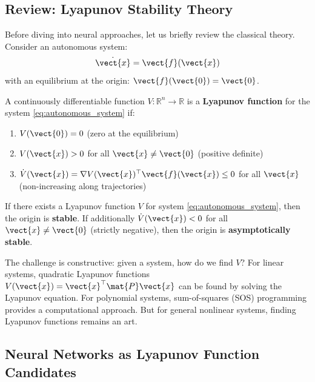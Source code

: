 \subsection{Review: Lyapunov Stability Theory}

Before diving into neural approaches, let us briefly review the classical theory. Consider an autonomous system:
\begin{equation}
\dot{\vect{x}} = \vect{f}(\vect{x})
\label{eq:autonomous_system}
\end{equation}
with an equilibrium at the origin: $\vect{f}(\vect{0}) = \vect{0}$.

\begin{definition}
\label{def:lyapunov}
A continuously differentiable function $V: \mathbb{R}^n \to \mathbb{R}$ is a \textbf{Lyapunov function} for the system \eqref{eq:autonomous_system} if:
\begin{enumerate}
    \item $V(\vect{0}) = 0$ (zero at the equilibrium)
    \item $V(\vect{x}) > 0$ for all $\vect{x} \neq \vect{0}$ (positive definite)
    \item $\dot{V}(\vect{x}) = \nabla V(\vect{x})^\top \vect{f}(\vect{x}) \leq 0$ for all $\vect{x}$ (non-increasing along trajectories)
\end{enumerate}
\end{definition}

\begin{theorem}
\label{thm:lyapunov_stability}
If there exists a Lyapunov function $V$ for system \eqref{eq:autonomous_system}, then the origin is \textbf{stable}. If additionally $\dot{V}(\vect{x}) < 0$ for all $\vect{x} \neq \vect{0}$ (strictly negative), then the origin is \textbf{asymptotically stable}.
\end{theorem}

The challenge is constructive: given a system, how do we find $V$? For linear systems, quadratic Lyapunov functions $V(\vect{x}) = \vect{x}^\top \mat{P} \vect{x}$ can be found by solving the Lyapunov equation. For polynomial systems, sum-of-squares (SOS) programming provides a computational approach. But for general nonlinear systems, finding Lyapunov functions remains an art.

\subsection{Neural Networks as Lyapunov Function Candidates}

